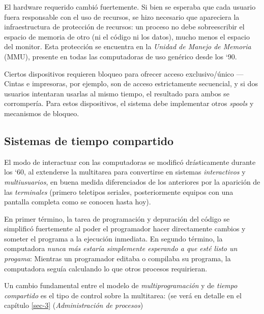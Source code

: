 \documentclass[11pt,fleqn]{book} %
\begin{document}
El hardware requerido cambió fuertemente. Si bien se esperaba que cada
usuario fuera responsable con el uso de recursos, se hizo necesario
que apareciera la infraestructura de protección de recursos: un
proceso no debe sobreescribir el espacio de memoria de otro (ni el
código ni los datos), mucho menos el espacio del monitor. Esta
protección  se encuentra en la \emph{Unidad de Manejo de Memoria} (MMU),
presente en todas las computadoras de uso genérico desde los `90.

Ciertos dispositivos requieren bloqueo para ofrecer acceso
exclusivo/único — Cintas e impresoras, por ejemplo, son de acceso
estrictamente secuencial, y si dos usuarios intentaran usarlas al
mismo tiempo, el resultado para ambos se corrompería. Para estos
dispositivos, el sistema debe implementar otros \emph{spools} y mecanismos
de bloqueo.
\subsection{Sistemas de tiempo compartido}
\label{sec-1-3-4}


El modo de interactuar con las computadoras se modificó drásticamente
durante los `60, al extenderse la multitarea para
convertirse en sistemas \emph{interactivos} y \emph{multiusuarios}, en buena
medida diferenciados de los anteriores por la aparición de las
\emph{terminales} (primero teletipos seriales, posteriormente equipos con
una pantalla completa como se conocen hasta hoy).

En primer término, la tarea de programación y depuración del código se
simplificó fuertemente al poder el programador hacer directamente
cambios y someter el programa a la ejecución inmediata. En segundo
término, la computadora \emph{nunca más estaría simplemente esperando a que esté listo un progama}: Mientras un programador editaba o compilaba su programa,
la computadora seguía calculando lo que otros procesos requirieran.

Un cambio fundamental entre el modelo de \emph{multiprogramación} y de
\emph{tiempo compartido} es el tipo de control sobre la multitarea:
(se verá en detalle en el capítulo \ref{sec-3} (\emph{Administración de procesos})
\end{document}

